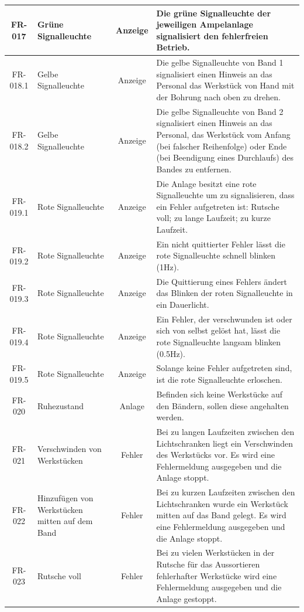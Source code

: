 \documentclass[oneside,a4paper,titlepage]{scrartcl}              %
\begin{document}
\begin{small}
\begin{center}
\begin{longtable}{|c|p{4cm}|c|p{7cm}|}
      \hline
      FR-017 & Grüne Signalleuchte & Anzeige & Die grüne Signalleuchte der jeweiligen Ampelanlage signalisiert den fehlerfreien Betrieb.\\
      \hline
      \rowcolor{lightgray} FR-018.1 & Gelbe Signalleuchte & Anzeige & Die gelbe Signalleuchte von Band 1 signalisiert einen Hinweis an das Personal das Werkstück von Hand mit der Bohrung nach oben zu drehen.\\
      \hline
      \rowcolor{lightgray} FR-018.2 & Gelbe Signalleuchte & Anzeige & Die gelbe Signalleuchte von Band 2 signalisiert einen Hinweis an das Personal, das Werkstück vom Anfang (bei falscher Reihenfolge) oder Ende (bei Beendigung eines Durchlaufs) des Bandes zu entfernen.\\
      \hline
      FR-019.1 & Rote Signalleuchte & Anzeige & Die Anlage besitzt eine rote Signalleuchte um zu signalisieren, dass ein Fehler aufgetreten ist: Rutsche voll; zu lange Laufzeit; zu kurze Laufzeit.\\
      \hline
      FR-019.2 & Rote Signalleuchte & Anzeige & Ein nicht quittierter Fehler lässt die rote Signalleuchte schnell blinken (1Hz).\\
      \hline
      FR-019.3 & Rote Signalleuchte & Anzeige & Die Quittierung eines Fehlers ändert das Blinken der roten Signalleuchte in ein Dauerlicht.\\
      \hline
      FR-019.4 & Rote Signalleuchte & Anzeige & Ein Fehler, der verschwunden ist oder sich von selbst gelöst hat, lässt die rote Signalleuchte langsam blinken (0.5Hz).\\
      \hline
      FR-019.5 & Rote Signalleuchte & Anzeige & Solange keine Fehler aufgetreten sind, ist die rote Signalleuchte erloschen.\\
      \hline
      \rowcolor{lightgray} FR-020 & Ruhezustand & Anlage & Befinden sich keine Werkstücke auf den Bändern, sollen diese angehalten werden.\\
      \hline
      FR-021 & Verschwinden von Werkstücken & Fehler & Bei zu langen Laufzeiten zwischen den Lichtschranken liegt ein Verschwinden des Werkstücks vor. Es wird eine Fehlermeldung ausgegeben und die Anlage stoppt.\\
      \hline
      \rowcolor{lightgray} FR-022 & Hinzufügen von Werkstücken mitten auf dem Band & Fehler & Bei zu kurzen Laufzeiten zwischen den Lichtschranken wurde ein Werkstück mitten auf das Band gelegt. Es wird eine Fehlermeldung ausgegeben und die Anlage stoppt.\\
      \hline
      FR-023 & Rutsche voll & Fehler & Bei zu vielen Werkstücken in der Rutsche für das Aussortieren fehlerhafter Werkstücke wird eine Fehlermeldung ausgegeben und die Anlage gestoppt.\\

\end{longtable}
\end{center}
\end{small}
\end{document}
